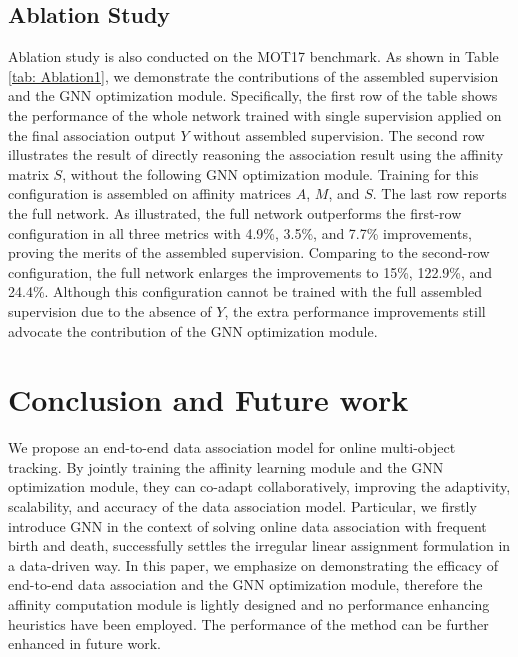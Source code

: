 \documentclass[10pt,twocolumn,letterpaper]{article}
\begin{document}
\subsection{Ablation Study}
\label{sec: 53}
Ablation study is also conducted on the MOT17 benchmark. As shown in Table \ref{tab: Ablation1}, we demonstrate the contributions of the assembled supervision and the GNN optimization module. Specifically, the first row of the table shows the performance of the whole network trained with single supervision applied on the final association output $Y$ without assembled supervision. The second row illustrates the result of directly reasoning the association result using the affinity matrix $S$, without the following GNN optimization module. Training for this configuration is assembled on affinity matrices $A$, $M$, and $S$. The last row reports the full network. As illustrated, the full network outperforms the first-row configuration in all three metrics with 4.9\%, 3.5\%, and 7.7\% improvements, proving the merits of the assembled supervision. Comparing to the second-row configuration, the full network enlarges the improvements to 15\%, 122.9\%, and 24.4\%. Although this configuration cannot be trained with the full assembled supervision due to the absence of $Y$, the extra performance improvements still advocate the contribution of the GNN optimization module.

\section{Conclusion and Future work}
We propose an end-to-end data association model for online multi-object tracking. By jointly training the affinity learning module and the GNN optimization module, they can co-adapt collaboratively, improving the adaptivity, scalability, and accuracy of the data association model. Particular, we firstly introduce GNN in the context of solving online data association with frequent birth and death, successfully settles the irregular linear assignment formulation in a data-driven way. In this paper, we emphasize on demonstrating the efficacy of end-to-end data association and the GNN optimization module, therefore the affinity computation module is lightly designed and no performance enhancing heuristics have been employed. The performance of the method can be further enhanced in future work.

{\small


}
\end{document}
